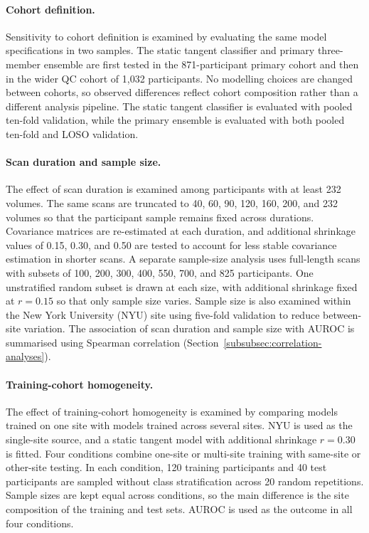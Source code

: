 \paragraph{\textbf{Cohort definition.}}
\label{par:cohort-definition}
Sensitivity to cohort definition is examined by evaluating the same model specifications in two samples. The static tangent classifier and primary three-member ensemble are first tested in the 871-participant primary cohort and then in the wider QC cohort of 1,032 participants. No modelling choices are changed between cohorts, so observed differences reflect cohort composition rather than a different analysis pipeline. The static tangent classifier is evaluated with pooled ten-fold validation, while the primary ensemble is evaluated with both pooled ten-fold and LOSO validation.

\paragraph{\textbf{Scan duration and sample size.}}
\label{par:duration-sample-size}
The effect of scan duration is examined among participants with at least 232 volumes. The same scans are truncated to 40, 60, 90, 120, 160, 200, and 232 volumes so that the participant sample remains fixed across durations. Covariance matrices are re-estimated at each duration, and additional shrinkage values of 0.15, 0.30, and 0.50 are tested to account for less stable covariance estimation in shorter scans. A separate sample-size analysis uses full-length scans with subsets of 100, 200, 300, 400, 550, 700, and 825 participants. One unstratified random subset is drawn at each size, with additional shrinkage fixed at $r=0.15$ so that only sample size varies. Sample size is also examined within the New York University (NYU) site using five-fold validation to reduce between-site variation. The association of scan duration and sample size with AUROC is summarised using Spearman correlation (Section~\ref{subsubsec:correlation-analyses}).

\paragraph{\textbf{Training-cohort homogeneity.}}
\label{par:training-homogeneity}
The effect of training-cohort homogeneity is examined by comparing models trained on one site with models trained across several sites. NYU is used as the single-site source, and a static tangent model with additional shrinkage $r=0.30$ is fitted. Four conditions combine one-site or multi-site training with same-site or other-site testing. In each condition, 120 training participants and 40 test participants are sampled without class stratification across 20 random repetitions. Sample sizes are kept equal across conditions, so the main difference is the site composition of the training and test sets. AUROC is used as the outcome in all four conditions.


